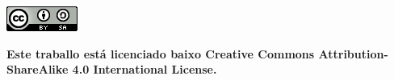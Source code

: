 
\begin{bottompar}
\begin{center}

\includegraphics{img/cclicence.png}

\textbf{Este traballo está licenciado baixo Creative Commons Attribution-ShareAlike 4.0 International License.}
\end{center}
\end{bottompar}